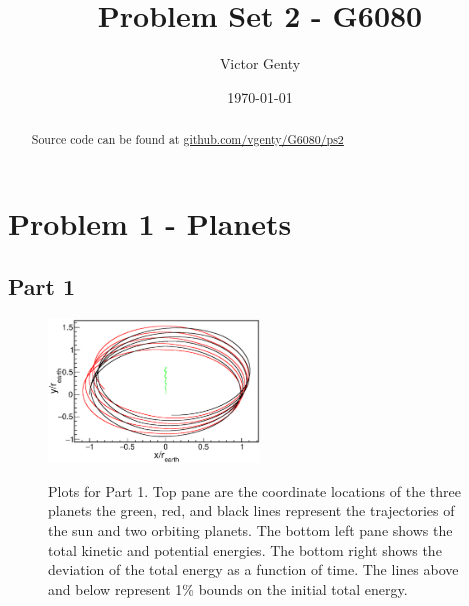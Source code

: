 \documentclass[singlepage,notitlepage,nofootinbib,11pt]{revtex4-1}
\begin{document}
\title{Problem Set 2 - G6080}
\author{Victor Genty}
\date{\today}
\begin{abstract}
\centering
Source code can be found at \href{https://github.com/vgenty/G6080/tree/master/ps2}{github.com/vgenty/G6080/ps2}
\end{abstract}
\maketitle
\section{Problem 1 - Planets}
\subsection{Part 1}
\begin{figure}[h]
  \centering
  \includegraphics[width=0.5\textwidth]{figures/1r.eps}
  \\
\hfill
  \caption{Plots for Part 1. Top pane are the coordinate locations of the three planets the green, red, and black lines represent the trajectories of the sun and two orbiting planets. The bottom left pane shows the total kinetic and potential energies. The bottom right shows the deviation of the total energy as a function of time. The lines above and below represent 1\% bounds on the initial total energy.}
\end{figure}
\end{document}
